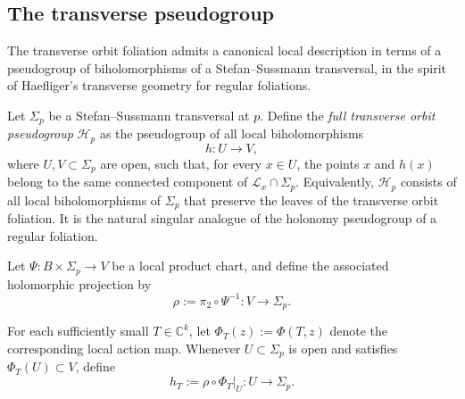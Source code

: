 \documentclass[11pt]{amsart}
\theoremstyle{definition}
\theoremstyle{remark}
\newcommand{\C}{\mathbb{C}}
\newcommand{\leaf}[1]{\mathcal{L}_{#1}}
\begin{document}
\subsection{The transverse pseudogroup}
%

The transverse orbit foliation admits a canonical local description in
terms of a pseudogroup of biholomorphisms of a Stefan--Sussmann
transversal, in the spirit of Haefliger's transverse geometry for
regular foliations.

Let $\Sigma_p$ be a Stefan--Sussmann transversal at $p$. Define the
\emph{full transverse orbit pseudogroup} $\mathcal H_p$ as the
pseudogroup of all local biholomorphisms
\[
    h:U\longrightarrow V,
\]
where $U,V\subset\Sigma_p$ are open, such that, for every $x\in U$, the
points $x$ and $h(x)$ belong to the same connected component of
$\leaf{x}\cap\Sigma_p$. Equivalently, $\mathcal H_p$ consists of all
local biholomorphisms of $\Sigma_p$ that preserve the leaves of the
transverse orbit foliation. It is the natural singular analogue of the
holonomy pseudogroup of a regular foliation.

Let $\Psi:B\times\Sigma_p\longrightarrow V$ be a local product chart,
and define the associated holomorphic projection by
\[
    \rho:=\pi_2\circ\Psi^{-1}:V\longrightarrow\Sigma_p.
\]
 
For each sufficiently small $T\in\C^k$, let
$\Phi_T(z):=\Phi(T,z)$ denote the corresponding local action map.
Whenever $U\subset\Sigma_p$ is open and satisfies $\Phi_T(U)\subset V$,
define
\[
    h_T:=\rho\circ\left.\Phi_T\right|_U:
    U\longrightarrow\Sigma_p.
\]

\end{document}
